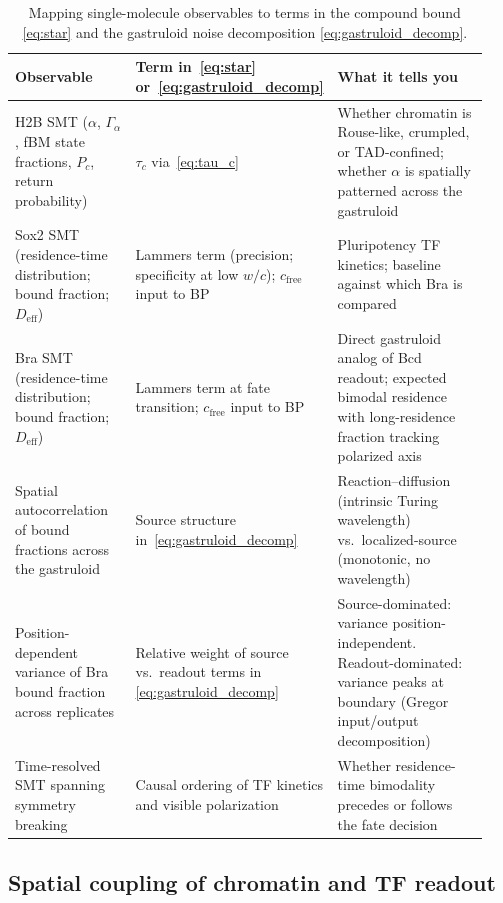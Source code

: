 \documentclass[11pt]{article}
\newcommand{\eff}{\mathrm{eff}}
\begin{document}
\begin{table}[h]
\centering
\small
\begin{tabular}{p{0.27\linewidth}p{0.30\linewidth}p{0.37\linewidth}}
\toprule
Observable & Term in~\eqref{eq:star} or~\eqref{eq:gastruloid_decomp} &
What it tells you \\
\midrule
H2B SMT ($\alpha$, $\Gamma_\alpha$, fBM state fractions, $P_c$,
return probability) & $\tau_c$ via~\eqref{eq:tau_c} & Whether chromatin is
Rouse-like, crumpled, or TAD-confined; whether $\alpha$ is spatially
patterned across the gastruloid \\
\addlinespace
Sox2 SMT (residence-time distribution; bound fraction; $D_{\eff}$) &
Lammers term (precision; specificity at low $w/c$); $c_{\mathrm{free}}$
input to BP & Pluripotency TF kinetics; baseline against which Bra is
compared \\
\addlinespace
Bra SMT (residence-time distribution; bound fraction; $D_{\eff}$) &
Lammers term at fate transition; $c_{\mathrm{free}}$ input to BP &
Direct gastruloid analog of Bcd readout; expected bimodal residence with
long-residence fraction tracking polarized axis \\
\addlinespace
Spatial autocorrelation of bound fractions across the gastruloid &
Source structure in~\eqref{eq:gastruloid_decomp} & Reaction--diffusion
(intrinsic Turing wavelength) vs.\ localized-source (monotonic, no
wavelength) \\
\addlinespace
Position-dependent variance of Bra bound fraction across replicates &
Relative weight of source vs.\ readout terms in
\eqref{eq:gastruloid_decomp} & Source-dominated: variance position-
independent. Readout-dominated: variance peaks at boundary
(Gregor input/output decomposition) \\
\addlinespace
Time-resolved SMT spanning symmetry breaking & Causal ordering of TF
kinetics and visible polarization & Whether residence-time bimodality
precedes or follows the fate decision \\
\bottomrule
\end{tabular}
\caption{Mapping single-molecule observables to terms in the compound bound
\eqref{eq:star} and the gastruloid noise decomposition
\eqref{eq:gastruloid_decomp}.}
\label{tab:program}
\end{table}

\subsection{Spatial coupling of chromatin and TF readout}
\end{document}
